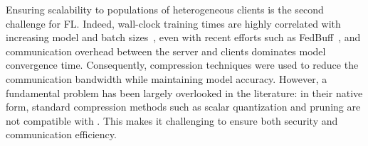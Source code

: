 Ensuring scalability to populations of heterogeneous clients is the second challenge for FL.
Indeed, wall-clock training times are highly correlated with increasing model and batch sizes~\cite{huba2021papaya}, even with recent efforts such as FedBuff~\cite{nguyen2021federated},
and communication overhead between the server and clients dominates model convergence time.
Consequently, compression techniques were used to reduce the communication bandwidth while maintaining model accuracy.
However, a fundamental problem has been largely overlooked in the literature: in their native form, standard compression methods such as scalar quantization and pruning are not compatible with \SecAgg.
This makes it challenging to ensure both security and communication efficiency.


